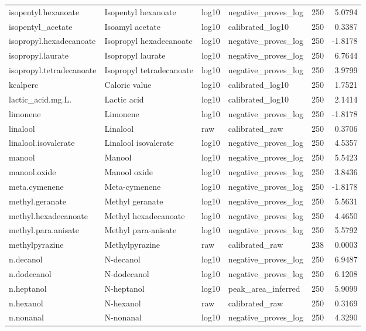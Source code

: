 {\begin{longtable}{llllrr}
isopentyl.hexanoate & Isopentyl hexanoate & log10 & negative\_proves\_log & 250 & 5.0794 \\
isopentyl\_acetate & Isoamyl acetate & log10 & calibrated\_log10 & 250 & 0.3387 \\
isopropyl.hexadecanoate & Isopropyl hexadecanoate & log10 & negative\_proves\_log & 250 & -1.8178 \\
isopropyl.laurate & Isopropyl laurate & log10 & negative\_proves\_log & 250 & 6.7644 \\
isopropyl.tetradecanoate & Isopropyl tetradecanoate & log10 & negative\_proves\_log & 250 & 3.9799 \\
kcalperc & Caloric value & log10 & calibrated\_log10 & 250 & 1.7521 \\
lactic\_acid.mg.L. & Lactic acid & log10 & calibrated\_log10 & 250 & 2.1414 \\
limonene & Limonene & log10 & negative\_proves\_log & 250 & -1.8178 \\
linalool & Linalool & raw & calibrated\_raw & 250 & 0.3706 \\
linalool.isovalerate & Linalool isovalerate & log10 & negative\_proves\_log & 250 & 4.5357 \\
manool & Manool & log10 & negative\_proves\_log & 250 & 5.5423 \\
manool.oxide & Manool oxide & log10 & negative\_proves\_log & 250 & 3.8436 \\
meta.cymenene & Meta-cymenene & log10 & negative\_proves\_log & 250 & -1.8178 \\
methyl.geranate & Methyl geranate & log10 & negative\_proves\_log & 250 & 5.5631 \\
methyl.hexadecanoate & Methyl hexadecanoate & log10 & negative\_proves\_log & 250 & 4.4650 \\
methyl.para.anisate & Methyl para-anisate & log10 & negative\_proves\_log & 250 & 5.5792 \\
methylpyrazine & Methylpyrazine & raw & calibrated\_raw & 238 & 0.0003 \\
n.decanol & N-decanol & log10 & negative\_proves\_log & 250 & 6.9487 \\
n.dodecanol & N-dodecanol & log10 & negative\_proves\_log & 250 & 6.1208 \\
n.heptanol & N-heptanol & log10 & peak\_area\_inferred & 250 & 5.9099 \\
n.hexanol & N-hexanol & raw & calibrated\_raw & 250 & 0.3169 \\
n.nonanal & N-nonanal & log10 & negative\_proves\_log & 250 & 4.3290 \\

\end{longtable}}
